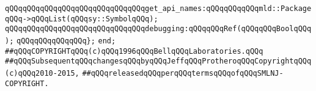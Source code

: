 \verb|qQQqqQQqqQQqqQQqqQQqqQQqqQQqqQQqget_api_names:qQQqqQQqqQQqmld::PackageqQQq->qQQqList(qQQqsy::SymbolqQQq);|\newline
\newline
\verb|qQQqqQQqqQQqqQQqqQQqqQQqqQQqqQQqdebugging:qQQqqQQqRef(qQQqqQQqBoolqQQq);|\newline
\verb|qQQqqQQqqQQqqQQq};|\newline
\verb|end;|\newline
\newline
\newline
\newline
\newline
\verb|##qQQqCOPYRIGHTqQQq(c)qQQq1996qQQqBellqQQqLaboratories.qQQq|\newline
\verb|##qQQqSubsequentqQQqchangesqQQqbyqQQqJeffqQQqProtheroqQQqCopyrightqQQq(c)qQQq2010-2015,|\newline
\verb|##qQQqreleasedqQQqperqQQqtermsqQQqofqQQqSMLNJ-COPYRIGHT.|\newline

